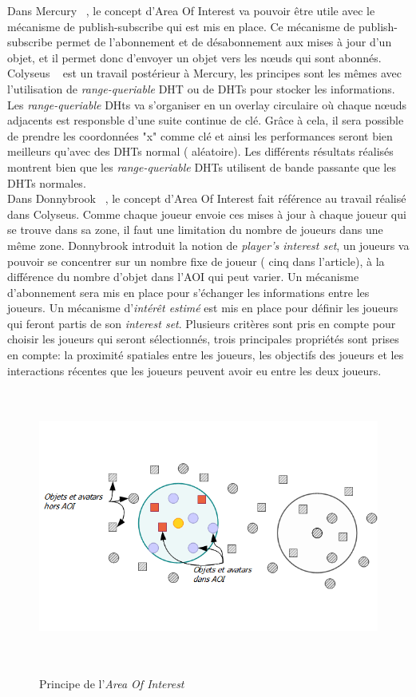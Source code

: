 	Dans Mercury ~\cite{1015507}, le concept d'Area Of Interest va pouvoir être utile avec le mécanisme de publish-subscribe qui est mis en place. Ce mécanisme de publish-subscribe permet de l'abonnement et de désabonnement aux mises à jour d'un objet, et il permet donc d'envoyer un objet vers les nœuds qui sont abonnés.\\
	Colyseus ~\cite{1267692} est un travail postérieur à Mercury, les principes sont les mêmes avec l'utilisation de \textit{range-queriable} DHT ou de DHTs pour stocker les informations. Les \textit{range-queriable} DHts va s'organiser en un overlay circulaire où chaque nœuds adjacents est responsble d'une suite continue de clé. Grâce à cela, il sera possible de prendre les coordonnées "x" comme clé et ainsi les performances seront bien meilleurs qu'avec des DHTs normal ( aléatoire). Les différents résultats réalisés montrent bien que les \textit{range-queriable} DHTs utilisent de bande passante que les DHTs normales. \\
	Dans Donnybrook ~\cite{1403002}, le concept d'Area Of Interest fait référence au travail réalisé dans Colyseus. Comme chaque joueur envoie ces mises à jour à chaque joueur qui se trouve dans sa zone, il faut une limitation du nombre de joueurs dans une même zone. Donnybrook introduit la notion de \textit{player's interest set}, un joueurs va pouvoir se concentrer sur un nombre fixe de joueur ( cinq dans l'article), à la différence du nombre d'objet dans l'AOI qui peut varier. Un mécanisme d'abonnement sera mis en place pour s'échanger les informations entre les joueurs. Un mécanisme d'\textit{intérêt estimé} est mis en place pour définir les joueurs qui feront partis de son \textit{interest set}. Plusieurs critères sont pris en compte pour choisir les joueurs qui seront sélectionnés, trois principales propriétés sont prises en compte: la proximité spatiales entre les joueurs, les objectifs des joueurs et les interactions récentes que les joueurs peuvent avoir eu entre les deux joueurs.\\
	\vspace{1cm}
        \begin{figure}[!h]
        \centering
        \includegraphics[width=16cm,height=9cm]{../Images/AOI.png}\\
        \caption{Principe de l'\textit{Area Of Interest}}
        \label{AOI}
        \end{figure}
	\vspace{1cm}
\newpage
